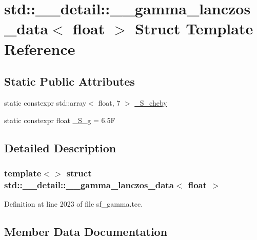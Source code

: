 \hypertarget{structstd_1_1____detail_1_1____gamma__lanczos__data_3_01float_01_4}{}\section{std\+:\+:\+\_\+\+\_\+detail\+:\+:\+\_\+\+\_\+gamma\+\_\+lanczos\+\_\+data$<$ float $>$ Struct Template Reference}
\label{structstd_1_1____detail_1_1____gamma__lanczos__data_3_01float_01_4}
\subsection*{Static Public Attributes}
\begin{DoxyCompactItemize}
\item 
static constexpr std\+::array$<$ float, 7 $>$ \hyperlink{structstd_1_1____detail_1_1____gamma__lanczos__data_3_01float_01_4_a2c49be7a79e21754e583099068cc1c3a}{\+\_\+\+S\+\_\+cheby}
\item 
static constexpr float \hyperlink{structstd_1_1____detail_1_1____gamma__lanczos__data_3_01float_01_4_aadc6da66fb542d6b88ddf3a0aef6249c}{\+\_\+\+S\+\_\+g} = 6.\+5F
\end{DoxyCompactItemize}


\subsection{Detailed Description}
\subsubsection*{template$<$$>$\newline
struct std\+::\+\_\+\+\_\+detail\+::\+\_\+\+\_\+gamma\+\_\+lanczos\+\_\+data$<$ float $>$}



Definition at line 2023 of file sf\+\_\+gamma.\+tcc.



\subsection{Member Data Documentation}
\mbox{\label{structstd_1_1____detail_1_1____gamma__lanczos__data_3_01float_01_4_a2c49be7a79e21754e583099068cc1c3a}} 
